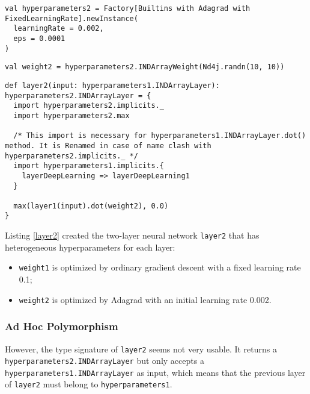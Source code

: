 \begin{lstlisting}[float={htbp},caption={Hyperparameters for Adagrad}, label={hyperparameters2}]
val hyperparameters2 = Factory[Builtins with Adagrad with FixedLearningRate].newInstance(
  learningRate = 0.002,
  eps = 0.0001
)
\end{lstlisting}

\begin{lstlisting}[float={htbp},caption={\Glspl{trainable variable} optimized by Adagrad}, label={weight2}]
val weight2 = hyperparameters2.INDArrayWeight(Nd4j.randn(10, 10))
\end{lstlisting}

\begin{lstlisting}[float={htbp},caption={A two-layer neural network built from heterogeneous hyperparameters}, label={layer2}]
def layer2(input: hyperparameters1.INDArrayLayer): hyperparameters2.INDArrayLayer = {
  import hyperparameters2.implicits._
  import hyperparameters2.max
  
  /* This import is necessary for hyperparameters1.INDArrayLayer.dot() method. It is Renamed in case of name clash with hyperparameters2.implicits._ */
  import hyperparameters1.implicits.{
  	layerDeepLearning => layerDeepLearning1
  }
  
  max(layer1(input).dot(weight2), 0.0)
}
\end{lstlisting}

Listing \ref{layer2} created the two-layer neural network \lstinline{layer2} that has heterogeneous hyperparameters for each layer:

\begin{itemize}
  \item \lstinline{weight1} is optimized by ordinary gradient descent with a fixed learning rate 0.1;
  \item \lstinline{weight2} is optimized by Adagrad \cite{duchi2011adaptive} with an initial learning rate 0.002.
\end{itemize}

\subsubsection{Ad Hoc Polymorphism}

However, the type signature of \lstinline{layer2} seems not very usable. It returns a \lstinline{hyperparameters2.INDArrayLayer} but only accepts a \lstinline{hyperparameters1.INDArrayLayer} as input, which means that the previous layer of \lstinline{layer2} must belong to \lstinline{hyperparameters1}.

